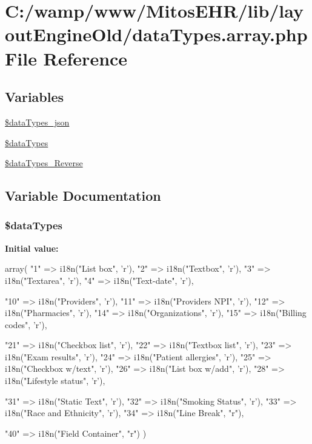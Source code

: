\hypertarget{data_types_8array_8php}{\section{\-C\-:/wamp/www/\-Mitos\-E\-H\-R/lib/layout\-Engine\-Old/data\-Types.array.\-php \-File \-Reference}
\label{data_types_8array_8php}
}
\subsection*{\-Variables}
\begin{DoxyCompactItemize}
\item 
\hyperlink{data_types_8array_8php_a73e226d365380923fee9695a0a0804ed}{\$data\-Types\-\_\-json}
\item 
\hyperlink{data_types_8array_8php_a044e1497c90b4466b2852d8210d445e6}{\$data\-Types}
\item 
\hyperlink{data_types_8array_8php_a38cbc2a1218bc7aeefb5ca532fc6f22d}{\$data\-Types\-\_\-\-Reverse}
\end{DoxyCompactItemize}


\subsection{\-Variable \-Documentation}
\hypertarget{data_types_8array_8php_a044e1497c90b4466b2852d8210d445e6}{
\subsubsection[{\$data\-Types}]{\setlength{\rightskip}{0pt plus 5cm}\$data\-Types}}\label{data_types_8array_8php_a044e1497c90b4466b2852d8210d445e6}
{\bfseries \-Initial value\-:}
\begin{DoxyCode}
 array(
        "1"  => i18n("List box", 'r'), 
        "2"  => i18n("Textbox", 'r'),
        "3"  => i18n("Textarea", 'r'),
        "4"  => i18n("Text-date", 'r'),
        
        "10" => i18n("Providers", 'r'),
        "11" => i18n("Providers NPI", 'r'),
        "12" => i18n("Pharmacies", 'r'),
        "14" => i18n("Organizations", 'r'),
        "15" => i18n("Billing codes", 'r'),
        
        "21" => i18n("Checkbox list", 'r'),
        "22" => i18n("Textbox list", 'r'),
        "23" => i18n("Exam results", 'r'),
        "24" => i18n("Patient allergies", 'r'),
        "25" => i18n("Checkbox w/text", 'r'),
        "26" => i18n("List box w/add", 'r'),
        "28" => i18n("Lifestyle status", 'r'),
        
        "31" => i18n("Static Text", 'r'),
        "32" => i18n("Smoking Status", 'r'),
        "33" => i18n("Race and Ethnicity", 'r'),
        "34" => i18n("Line Break", "r"),
        
        "40" => i18n("Field Container", "r")
)
\end{DoxyCode}



